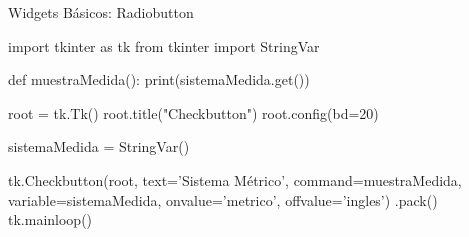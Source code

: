 \documentclass[10pt, envcountsect , spanish]{beamer}
\begin{document}
\begin{frame}[fragile]{Widgets Básicos: Radiobutton}

\small
\begin{pyverbatim}[][frame=single]
import tkinter as tk
from tkinter import StringVar

def muestraMedida():
    print(sistemaMedida.get())

root = tk.Tk()
root.title("Checkbutton")
root.config(bd=20)

sistemaMedida = StringVar()

tk.Checkbutton(root, text='Sistema Métrico', 
                command=muestraMedida, 
                variable=sistemaMedida,
                onvalue='metrico', 
                offvalue='ingles')
                .pack()
tk.mainloop()
\end{pyverbatim}




\end{frame}
\end{document}
